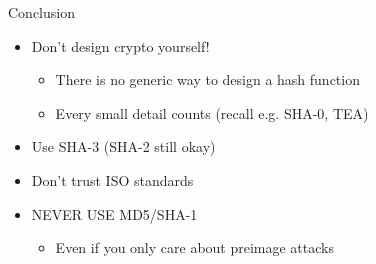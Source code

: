 \documentclass[xcolor=table,usenames,dvipsnames,compress]{beamer}
\begin{document}
\begin{frame}{Conclusion}
\begin{itemize}
\item Don't design crypto yourself!
\begin{itemize}
\item There is no generic way to design a hash function
\item Every small detail counts (recall e.g. SHA-0, TEA)
\end{itemize}
\item Use SHA-3 (SHA-2 still okay)
\item Don't trust ISO standards
\item NEVER USE MD5/SHA-1
\begin{itemize}
\item Even if you only care about preimage attacks
\end{itemize}
\end{itemize}
\end{frame}
\end{document}
